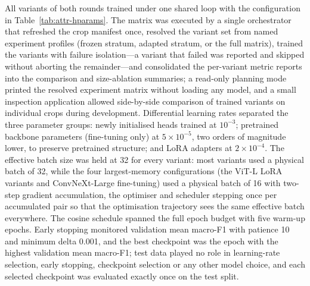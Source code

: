All variants of both rounds trained under one shared loop with the configuration in Table~\ref{tab:attr-hparams}. The matrix was executed by a single orchestrator that refreshed the crop manifest once, resolved the variant set from named experiment profiles (frozen stratum, adapted stratum, or the full matrix), trained the variants with failure isolation---a variant that failed was reported and skipped without aborting the remainder---and consolidated the per-variant metric reports into the comparison and size-ablation summaries; a read-only planning mode printed the resolved experiment matrix without loading any model, and a small inspection application allowed side-by-side comparison of trained variants on individual crops during development. Differential learning rates separated the three parameter groups: newly initialised heads trained at $10^{-3}$; pretrained backbone parameters (fine-tuning only) at $5 \times 10^{-5}$, two orders of magnitude lower, to preserve pretrained structure; and LoRA adapters at $2 \times 10^{-4}$. The effective batch size was held at 32 for every variant: most variants used a physical batch of 32, while the four largest-memory configurations (the ViT-L LoRA variants and ConvNeXt-Large fine-tuning) used a physical batch of 16 with two-step gradient accumulation, the optimiser and scheduler stepping once per accumulated pair so that the optimisation trajectory sees the same effective batch everywhere. The cosine schedule spanned the full epoch budget with five warm-up epochs. Early stopping monitored validation mean macro-F1 with patience 10 and minimum delta 0.001, and the best checkpoint was the epoch with the highest validation mean macro-F1; test data played no role in learning-rate selection, early stopping, checkpoint selection or any other model choice, and each selected checkpoint was evaluated exactly once on the test split.

